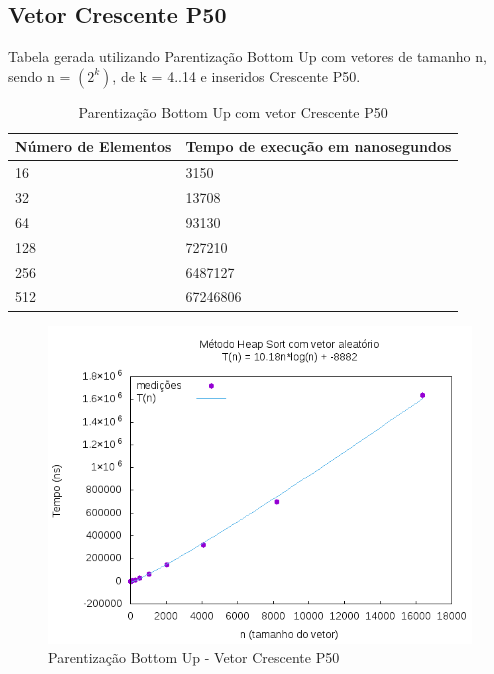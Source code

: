 \documentclass[12pt,a4paper,twoside]{report}
\begin{document}
\subsection{Vetor Crescente P50}
Tabela gerada utilizando Parentização Bottom Up com vetores de tamanho n, sendo n = $(2^k)$, de k = 4..14 e inseridos Crescente P50.
\begin{table}[H]
\centering
\caption{Parentização Bottom Up com vetor Crescente P50}
\label{my-label}
\begin{tabular}{|l|l|}
\hline
\multicolumn{1}{|c|}{\textbf{Número de Elementos}} & \multicolumn{1}{c|}{\textbf{Tempo de execução em nanosegundos}} \\ \hline
16 & 3150 \\ \hline
32 & 13708 \\ \hline
64 & 93130 \\ \hline
128 & 727210 \\ \hline
256 & 6487127 \\ \hline
512 & 67246806 \\ \hline
\end{tabular}
\end{table}

\begin{figure}[H]
    \centering
    \includegraphics[width=0.7\linewidth]{graficos/HeapSort/vIntAleatorio/vIntAleatorio.png}
  \caption{Parentização Bottom Up - Vetor Crescente P50}
\end{figure}
\end{document}
